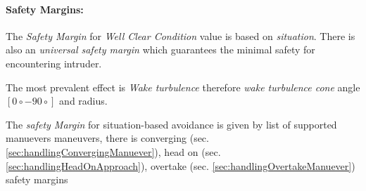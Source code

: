 \paragraph{Safety Margins:} The \emph{Safety Margin} for \emph{Well Clear Condition} value is based on \emph{situation}. There is also an \emph{universal safety margin} which guarantees the minimal safety for encountering intruder. 

The most prevalent effect is \emph{Wake turbulence} therefore \emph{wake turbulence cone} angle $[0\circ -90\circ ]$ and radius. 

The \emph{safety Margin} for situation-based avoidance is given by list of supported manuevers maneuvers, there is converging (sec. \ref{sec:handlingConvergingManuever}), head on (sec. \ref{sec:handlingHeadOnApproach}), overtake (sec. \ref{sec:handlingOvertakeManuever}) safety margins



